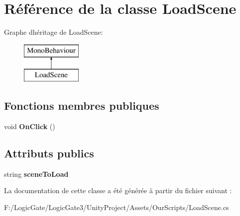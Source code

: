 \hypertarget{class_load_scene}{}\section{Référence de la classe Load\+Scene}
\label{class_load_scene}
Graphe d\textquotesingle{}héritage de Load\+Scene\+:\begin{figure}[H]
\begin{center}
\leavevmode
\includegraphics[height=2.000000cm]{class_load_scene}
\end{center}
\end{figure}
\subsection*{Fonctions membres publiques}
\begin{DoxyCompactItemize}
\item 
\mbox{\label{class_load_scene_a14b31f2bd3ebd80e6561f17468892db3}} 
void {\bfseries On\+Click} ()
\end{DoxyCompactItemize}
\subsection*{Attributs publics}
\begin{DoxyCompactItemize}
\item 
\mbox{\label{class_load_scene_a5b9aeb8ede8c3f3e65243edad89d9c1e}} 
string {\bfseries scene\+To\+Load}
\end{DoxyCompactItemize}


La documentation de cette classe a été générée à partir du fichier suivant \+:\begin{DoxyCompactItemize}
\item 
F\+:/\+Logic\+Gate/\+Logic\+Gate3/\+Unity\+Project/\+Assets/\+Our\+Scripts/Load\+Scene.\+cs\end{DoxyCompactItemize}
